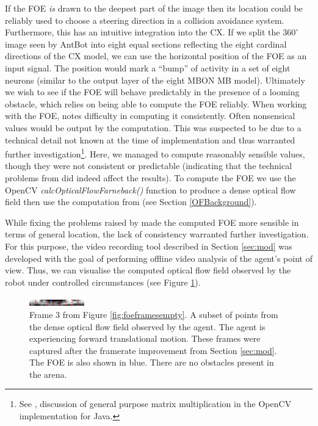 \documentclass[a4paper,11pt,twoside,openright]{article}
\begin{document}
If the FOE \textit{is} drawn to the deepest part of the image then its
location could be reliably used to choose a steering direction in a
collision avoidance system. Furthermore, this has an intuitive
integration into the CX. If we split the $360^{\circ}$ image seen by
AntBot into eight equal sections reflecting the eight cardinal
directions of the CX model, we can use the horizontal position of the
FOE as an input signal. The position would mark a ``bump'' of activity
in a set of eight neurons (similar to the output layer of the eight
MBON MB model). Ultimately we wish to see if the FOE will behave
predictably in the presence of a looming obstacle, which relies on
being able to compute the FOE reliably.  When working with the FOE,
\cite{Mitchell2018} notes difficulty in computing it
consistently. Often nonsensical values would be output by the
computation. This was suspected to be due to a technical detail not
known at the time of implementation and thus warranted further
investigation\footnote{See \cite{Mitchell2018}, discussion of general
  purpose matrix multiplication in the OpenCV implementation for
  Java.}. Here, we managed to compute reasonably sensible values,
though they were not consistent or predictable (indicating that the
technical problems from \cite{Mitchell2018} did indeed affect the
results). To compute the FOE we use the OpenCV
\textit{calcOpticalFlowFarneback()} function to produce a dense
optical flow field then use the computation from \cite{ODonovan2005}
(see Section \ref{OFBackground}).
\newline
\par

While fixing the problems raised by \cite{Mitchell2018} made the computed FOE
more sensible in terms of general location, the lack of consistency warranted
further investigation. For this purpose, the video recording tool described
in Section \ref{sec:mod} was developed with the goal of performing offline
video analysis of the agent's point of view. Thus, we can visualise the
computed optical flow field observed by the robot under controlled circumstances
(see Figure \ref{fig:flowfield}).\newline\par

\begin{figure}[h!]
  \centering
  \includegraphics[width=\textwidth]{frame_00066}
  \caption{\label{fig:flowfield} Frame 3 from Figure
    \ref{fig:foeframesempty}. A subset of points from the dense
    optical flow field observed by the agent.  The agent is
    experiencing forward translational motion. These frames were
    captured after the framerate improvement from Section
    \ref{sec:mod}. The FOE is also shown in blue. There are no
    obstacles present in the arena.  }
\end{figure}
\end{document}
